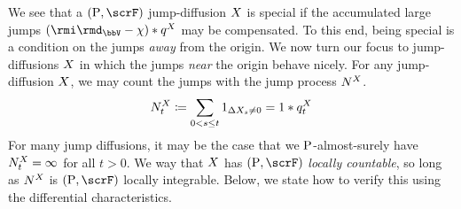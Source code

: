 We see that a $(\Prb, \scrF)$ jump-diffusion $X$ is special if the accumulated large jumps $(\id_\vecSpace - \trunc) \ast \jumpMeas^\X$ may be compensated.
To this end, being special is a condition on the jumps \emph{away} from the origin.
We now turn our focus to jump-diffusions $X$ in which the jumps \emph{near} the origin behave nicely.
For any jump-diffusion $X$, we may count the jumps with the jump process $N^X$.
\begin{equation}
  \label{eq:jump-process}
  N^X_t \coloneqq \sum_{0 < s \leq t} 1_{\Delta X_s \neq 0} = 1 \ast q^X_t
\end{equation}
For many jump diffusions, it may be the case that we ${\operatorname{P}}$-almost-surely have $N^X_t = \infty$ for all $t > 0$.
We way that $X$ has $(\Prb, \scrF)$ \emph{locally countable}, so long as $N^X$ is $(\Prb, \scrF)$ locally integrable.
Below, we state how to verify this using the differential characteristics.



